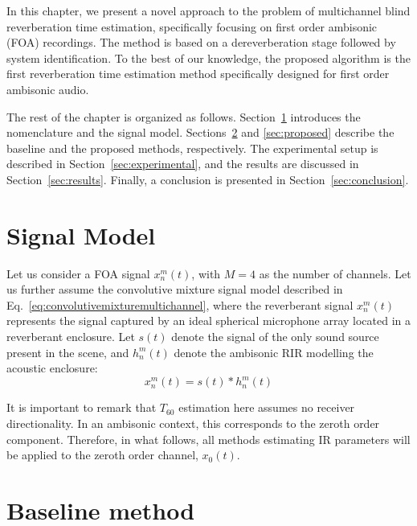 In this chapter, we present a novel approach to the problem of multichannel blind reverberation time estimation, specifically focusing on first order ambisonic (FOA) recordings. 
The method is based on a dereverberation stage followed by system identification.
To the best of our knowledge, the proposed algorithm is the first reverberation time estimation method specifically designed for first order ambisonic audio. 

The rest of the chapter is organized as follows. Section~\ref{sec:signalmodel} introduces the nomenclature and the signal model. Sections~\ref{sec:baseline} and \ref{sec:proposed} describe the baseline and the proposed methods, respectively. The experimental setup is described in Section~\ref{sec:experimental}, and the results are discussed in Section~\ref{sec:results}. Finally, a conclusion is presented in Section~\ref{sec:conclusion}.

\section{Signal Model}
\label{sec:signalmodel}

Let us consider a FOA signal $x_n^m(t)$, with $M=4$ as the number of channels.
Let us further assume the convolutive mixture signal model described in Eq.~\ref{eq:convolutivemixturemultichannel}, where the reverberant signal $x_n^m(t)$ represents the signal captured by an ideal spherical microphone array located in a reverberant enclosure. 
Let $s(t)$ denote the signal of the only sound source present in the scene, and $h_n^m(t)$ denote the ambisonic RIR modelling the acoustic enclosure:
\begin{equation}
	x_n^m(t) = s(t) \ast h_n^m(t)
\end{equation}

It is important to remark that $T_{60}$ estimation here assumes no receiver directionality. In an ambisonic context, this corresponds to the zeroth order component. Therefore, in what follows, all methods estimating IR parameters will be applied to the zeroth order channel, $x_0(t)$.

\section{Baseline method}
\label{sec:baseline}



